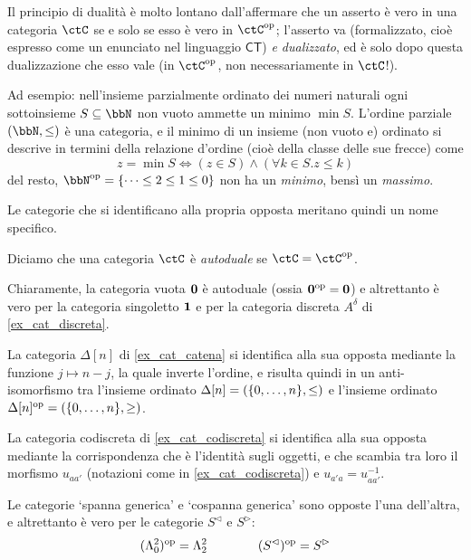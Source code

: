 \begin{remark}\label{ocio_al_duale}
 Il principio di dualità è molto lontano dall'affermare che un asserto è vero in una categoria \(\ctC\) se e solo se esso è vero in \(\ctC^\op\); l'asserto va (formalizzato, cioè espresso come un enunciato nel linguaggio \(\mathsf{CT}\)) \emph{e dualizzato}, ed è solo dopo questa dualizzazione che esso vale (in \(\ctC^\op\), non necessariamente in \(\ctC\)!).

 Ad esempio: nell'insieme parzialmente ordinato dei numeri naturali ogni sottoinsieme \(S\subseteq\bbN\) non vuoto ammette un minimo \(\min S\). L'ordine parziale \((\bbN,\le)\) è una categoria, e il minimo di un insieme (non vuoto e) ordinato si descrive in termini della relazione d'ordine (cioè della classe delle sue frecce) come
 \[z = \min S \iff (z\in S)\land (\forall k\in S.z\le k)\]
 del resto, \(\bbN^\op = \{\dots\le 2 \le 1 \le 0\}\) non ha un \emph{minimo}, bensì un \emph{massimo}.
\end{remark}
Le categorie che si identificano alla propria opposta meritano quindi un nome specifico.
\begin{definition}
 Diciamo che una categoria \(\ctC\) è \emph{autoduale} se \(\ctC=\ctC^\op\).
\end{definition}
\begin{example}
 Chiaramente, la categoria vuota \(\mathbf{0}\) è autoduale (ossia \(\mathbf{0}^{\text{op}}=\mathbf{0}\)) e altrettanto è vero per la categoria singoletto \(\mathbf{1}\) e per la categoria discreta \(A^\delta\) di \ref{ex_cat_discreta}.

 La categoria \(\Delta[n]\) di \ref{ex_cat_catena} si identifica alla sua opposta mediante la funzione \(j\mapsto n-j\), la quale inverte l'ordine, e risulta quindi in un anti-isomorfismo tra l'insieme ordinato \(\Delta[n]=(\{\iter[0]n\},\le)\) e l'insieme ordinato \(\Delta[n]^\op = (\{\iter[0]n\},\ge)\).

 La categoria codiscreta di \ref{ex_cat_codiscreta} si identifica alla sua opposta mediante la corrispondenza che è l'identità sugli oggetti, e che scambia tra loro il morfismo \(u_{aa'}\) (notazioni come in \ref{ex_cat_codiscreta}) e \(u_{a'a} = u_{aa'}^{-1}\).

 Le categorie `spanna generica' e `cospanna generica' sono opposte l'una dell'altra, e altrettanto è vero per le categorie \(S^\lhd\) e \(S^\rhd\):
 \[(\Lambda^2_0)^{\text{op}} = \Lambda^2_2\qquad\qquad (S^\lhd)^{\text{op}} = S^\rhd\]
\end{example}
